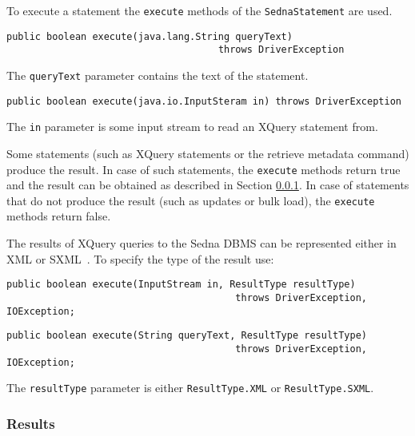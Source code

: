 \documentclass[a4paper,12pt]{article}
\begin{document}
To execute a statement the \verb!execute! methods of the \verb!SednaStatement! are used.


\begin{verbatim}
public boolean execute(java.lang.String queryText)
                                     throws DriverException
\end{verbatim}

The \verb!queryText! parameter contains the text of the statement.

\begin{verbatim}
public boolean execute(java.io.InputSteram in) throws DriverException
\end{verbatim}

The \verb!in! parameter is some input stream to read an XQuery statement from.

Some statements (such as XQuery statements or the retrieve metadata command) produce the result. In case of such statements, the \verb!execute! methods return true and the result can be obtained as described in Section \ref{sec:results}. In case of statements that do not produce the result (such as updates or bulk load), the \verb!execute! methods return false.

The results of XQuery queries to the Sedna DBMS can be represented either in XML or SXML~\cite{paper:sxml}. To specify the type of the result use:

\begin{verbatim}
public boolean execute(InputStream in, ResultType resultType)
                                        throws DriverException, IOException;
\end{verbatim}
\begin{verbatim}
public boolean execute(String queryText, ResultType resultType)
                                        throws DriverException, IOException;
\end{verbatim}

The \verb!resultType! parameter is either \verb!ResultType.XML! or \verb!ResultType.SXML!.


\subsubsection{Results}
\label{sec:results}
\end{document}
